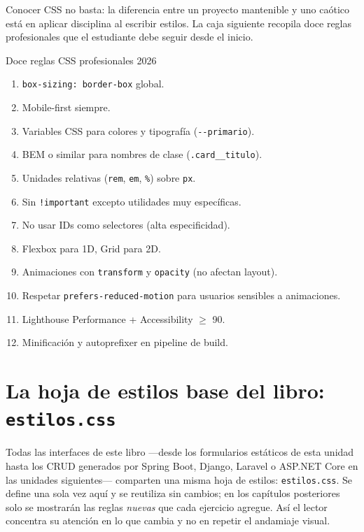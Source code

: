 Conocer CSS no basta: la diferencia entre un proyecto
mantenible y uno caótico está en aplicar disciplina al escribir
estilos. La caja siguiente recopila doce reglas profesionales que
el estudiante debe seguir desde el inicio.


\begin{cajabuenas}{Doce reglas CSS profesionales 2026}
\begin{enumerate}
\item \texttt{box-sizing: border-box} global.
\item Mobile-first siempre.
\item Variables CSS para colores y tipografía (\texttt{-{}-primario}).
\item BEM o similar para nombres de clase
(\texttt{.card\_\_titulo}).
\item Unidades relativas (\texttt{rem}, \texttt{em}, \texttt{\%})
sobre \texttt{px}.
\item Sin \texttt{!important} excepto utilidades muy específicas.
\item No usar IDs como selectores (alta especificidad).
\item Flexbox para 1D, Grid para 2D.
\item Animaciones con \texttt{transform} y \texttt{opacity}
(no afectan layout).
\item Respetar \texttt{prefers-reduced-motion} para usuarios sensibles
a animaciones.
\item Lighthouse Performance + Accessibility $\geq$ 90.
\item Minificación y autoprefixer en pipeline de build.
\end{enumerate}
\end{cajabuenas}

\section{La hoja de estilos base del libro: \texttt{estilos.css}}
\label{sec:estilos-base}

Todas las interfaces de este libro ---desde los formularios estáticos de
esta unidad hasta los CRUD generados por Spring Boot, Django, Laravel o
ASP.NET Core en las unidades siguientes--- comparten una misma hoja de
estilos: \texttt{estilos.css}. Se define una sola vez aquí y se reutiliza
sin cambios; en los capítulos posteriores solo se mostrarán las reglas
\emph{nuevas} que cada ejercicio agregue. Así el lector concentra su
atención en lo que cambia y no en repetir el andamiaje visual.

